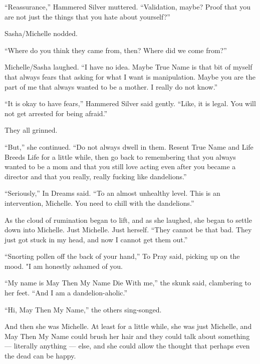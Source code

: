 ``Reassurance,'' Hammered Silver muttered. ``Validation, maybe? Proof that you are not just the things that you hate about yourself?''

Sasha/Michelle nodded.

``Where do you think they came from, then? Where did we come from?''

Michelle/Sasha laughed. ``I have no idea. Maybe True Name is that bit of myself that always fears that asking for what I want is manipulation. Maybe you are the part of me that always wanted to be a mother. I really do not know.''

``It is okay to have fears,'' Hammered Silver said gently. ``Like, it is legal. You will not get arrested for being afraid.''

They all grinned.

``But,'' she continued. ``Do not always dwell in them. Resent True Name and Life Breeds Life for a little while, then go back to remembering that you always wanted to be a mom and that you still love acting even after you became a director and that you really, really fucking like dandelions.''

``Seriously,'' In Dreams said. ``To an almost unhealthy level. This is an intervention, Michelle. You need to chill with the dandelions.''

As the cloud of rumination began to lift, and as she laughed, she began to settle down into Michelle. Just Michelle. Just herself. ``They cannot be that bad. They just got stuck in my head, and now I cannot get them out.''

``Snorting pollen off the back of your hand,'' To Pray said, picking up on the mood. "I am honestly ashamed of you.

``My name is May Then My Name Die With me,'' the skunk said, clambering to her feet. ``And I am a dandelion-aholic.''

``Hi, May Then My Name,'' the others sing-songed.

And then she was Michelle. At least for a little while, she was just Michelle, and May Then My Name could brush her hair and they could talk about something — literally anything — else, and she could allow the thought that perhaps even the dead can be happy.

